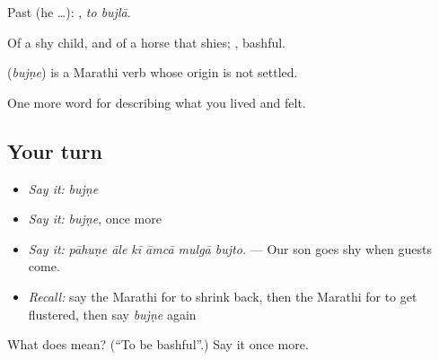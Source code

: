 Past (he …):  , \emph{to bujlā}.

Of a shy child, and of a horse that shies; , bashful.

\begin{cousinweb}
\textbf{} (\emph{bujṇe}) is a Marathi verb whose origin is not settled.
\end{cousinweb}

\begin{grammarlens}[title={What you've built}]
One more word for describing what you lived and felt.
\end{grammarlens}

\subsection*{Your turn}
\begin{itemize}
\raggedright
  \item \emph{Say it:} \emph{bujṇe}
  \item \emph{Say it:} \emph{bujṇe}, once more
  \item \emph{Say it:} \emph{pāhuṇe āle kī āmcā mulgā bujto.} — Our son goes shy when guests come.
  \item \emph{Recall:} say the Marathi for to shrink back, then the Marathi for to get flustered, then say \emph{bujṇe} again
\end{itemize}

\begin{tcolorbox}[breakable,colback=teal!4,colframe=teal!35!black,title={Before you move on}]
What does  mean? (\textquotedblleft{}To be bashful\textquotedblright{}.) Say it once more.
\end{tcolorbox}
